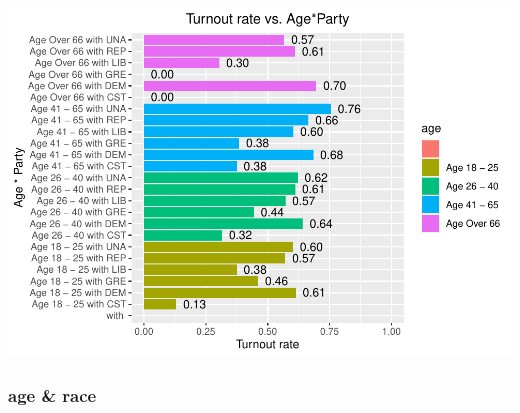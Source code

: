 \documentclass[
]{article}
\begin{document}
\includegraphics{CS2_files/figure-latex/unnamed-chunk-15-1.pdf}

\hypertarget{age-race}{%
\subsubsection{age \& race}\label{age-race}}
\end{document}
